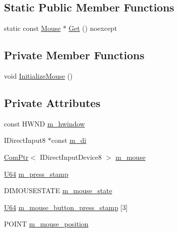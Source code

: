 \subsection*{Static Public Member Functions}
\begin{DoxyCompactItemize}
\item 
static const \hyperlink{classmage_1_1_mouse}{Mouse} $\ast$ \hyperlink{classmage_1_1_mouse_aa62bca1d085e86eeff1bf07e232e2a24}{Get} () noexcept
\end{DoxyCompactItemize}
\subsection*{Private Member Functions}
\begin{DoxyCompactItemize}
\item 
void \hyperlink{classmage_1_1_mouse_ac158b6d6fff5b05dea5ebefa86c0d56a}{Initialize\+Mouse} ()
\end{DoxyCompactItemize}
\subsection*{Private Attributes}
\begin{DoxyCompactItemize}
\item 
const H\+W\+ND \hyperlink{classmage_1_1_mouse_a51592b367595f8ed772266104fc813c5}{m\+\_\+hwindow}
\item 
I\+Direct\+Input8 $\ast$const \hyperlink{classmage_1_1_mouse_a892a9e1d5ad16ac9b67a5f69fbfedeab}{m\+\_\+di}
\item 
\hyperlink{namespacemage_ae74f374780900893caa5555d1031fd79}{Com\+Ptr}$<$ I\+Direct\+Input\+Device8 $>$ \hyperlink{classmage_1_1_mouse_a3f2803f3c0e008f5d764a11de3dbe098}{m\+\_\+mouse}
\item 
\hyperlink{namespacemage_a6672cf3c861707ce4a3235a3eb43941d}{U64} \hyperlink{classmage_1_1_mouse_a7633df92a818760b3efe694d4688961c}{m\+\_\+press\+\_\+stamp}
\item 
D\+I\+M\+O\+U\+S\+E\+S\+T\+A\+TE \hyperlink{classmage_1_1_mouse_af99645fb4226077abee4532a5e663066}{m\+\_\+mouse\+\_\+state}
\item 
\hyperlink{namespacemage_a6672cf3c861707ce4a3235a3eb43941d}{U64} \hyperlink{classmage_1_1_mouse_ac10dd127b4289731e0058f9588259c28}{m\+\_\+mouse\+\_\+button\+\_\+press\+\_\+stamp} \mbox{[}3\mbox{]}
\item 
P\+O\+I\+NT \hyperlink{classmage_1_1_mouse_a2a8332ef7a4daa0f9ed48a9a1ad80684}{m\+\_\+mouse\+\_\+position}
\end{DoxyCompactItemize}


